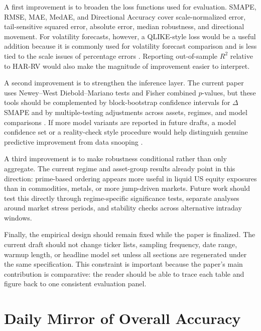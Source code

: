 ﻿\documentclass[a4paper]{article}
\renewcommand{\thesection}{\Roman{section}.}
\begin{document}
\noindent
A first improvement is to broaden the loss functions used for evaluation. SMAPE, RMSE, MAE, MedAE, and Directional Accuracy cover scale-normalized error, tail-sensitive squared error, absolute error, median robustness, and directional movement. For volatility forecasts, however, a QLIKE-style loss would be a useful addition because it is commonly used for volatility forecast comparison and is less tied to the scale issues of percentage errors \cite{patton2011}. Reporting out-of-sample $R^2$ relative to HAR-RV would also make the magnitude of improvement easier to interpret.

\noindent
A second improvement is to strengthen the inference layer. The current paper uses Newey--West Diebold--Mariano tests and Fisher combined $p$-values, but these tools should be complemented by block-bootstrap confidence intervals for $\Delta$SMAPE and by multiple-testing adjustments across assets, regimes, and model comparisons \cite{politis1994}. If more model variants are reported in future drafts, a model confidence set or a reality-check style procedure would help distinguish genuine predictive improvement from data snooping \cite{hansen2011,white2000}.

\noindent
A third improvement is to make robustness conditional rather than only aggregate. The current regime and asset-group results already point in this direction: prime-based ordering appears more useful in liquid US equity exposures than in commodities, metals, or more jump-driven markets. Future work should test this directly through regime-specific significance tests, separate analyses around market stress periods, and stability checks across alternative intraday windows.

\noindent
Finally, the empirical design should remain fixed while the paper is finalized. The current draft should not change ticker lists, sampling frequency, date range, warmup length, or headline model set unless all sections are regenerated under the same specification. This constraint is important because the paper's main contribution is comparative: the reader should be able to trace each table and figure back to one consistent evaluation panel.

\newpage
\appendix
\renewcommand{\thesection}{Appendix \Alph{section}}

\section{Daily Mirror of Overall Accuracy}
\end{document}
